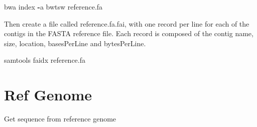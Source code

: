 \documentclass[]{book}
\newenvironment{Shaded}{\begin{snugshade}}{\end{snugshade}}
\newcommand{\KeywordTok}[1]{\textcolor[rgb]{0.13,0.29,0.53}{\textbf{#1}}}
\newcommand{\CharTok}[1]{\textcolor[rgb]{0.31,0.60,0.02}{#1}}
\newcommand{\SpecialCharTok}[1]{\textcolor[rgb]{0.00,0.00,0.00}{#1}}
\newcommand{\StringTok}[1]{\textcolor[rgb]{0.31,0.60,0.02}{#1}}
\newcommand{\ImportTok}[1]{#1}
\newcommand{\CommentTok}[1]{\textcolor[rgb]{0.56,0.35,0.01}{\textit{#1}}}
\newcommand{\VariableTok}[1]{\textcolor[rgb]{0.00,0.00,0.00}{#1}}
\newcommand{\ControlFlowTok}[1]{\textcolor[rgb]{0.13,0.29,0.53}{\textbf{#1}}}
\newcommand{\OperatorTok}[1]{\textcolor[rgb]{0.81,0.36,0.00}{\textbf{#1}}}
\newcommand{\NormalTok}[1]{#1}
\begin{document}
\begin{Shaded}
\begin{Highlighting}[]
\NormalTok{bwa index }\OperatorTok{-}\NormalTok{a bwtsw reference.fa}
\end{Highlighting}
\end{Shaded}

Then create a file called reference.fa.fai, with one record per line for
each of the contigs in the FASTA reference file. Each record is composed
of the contig name, size, location, basesPerLine and bytesPerLine.

\begin{Shaded}
\begin{Highlighting}[]
\NormalTok{samtools faidx reference.fa}
\end{Highlighting}
\end{Shaded}

\section{Ref Genome}\label{ref-genome}

Get sequence from reference genome

\begin{Shaded}
\end{Shaded}
\end{document}
